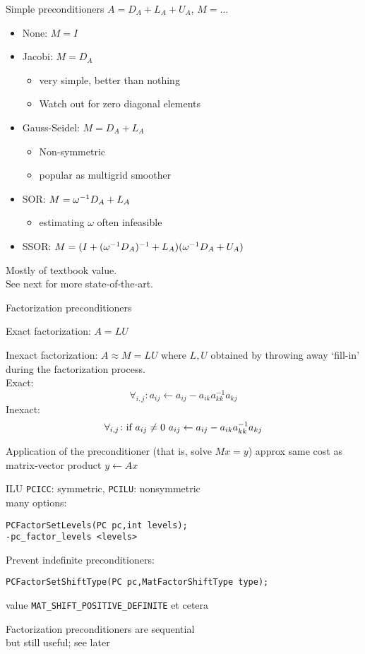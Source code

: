 \begin{numberedframe}{Simple preconditioners}
  $A = D_A+L_A+U_A$, $M=\ldots$
  \begin{itemize}
  \item None: $M=I$
  \item Jacobi: $M=D_A$
    \begin{itemize}
    \item very simple, better than nothing
    \item Watch out for zero diagonal elements
    \end{itemize}
  \item Gauss-Seidel: $M=D_A+L_A$
    \begin{itemize}
    \item Non-symmetric
    \item popular as multigrid smoother
    \end{itemize}
  \item SOR: $M=\omega^{-1} D_A+L_A$
    \begin{itemize}
    \item estimating $\omega$ often infeasible
    \end{itemize}
  \item SSOR: $M=(I+(\omega^{-1} D_A)^{-1}+L_A)(\omega^{-1} D_A+U_A)$
  \end{itemize}
  Mostly of textbook value.\\
  See next for more state-of-the-art.
\end{numberedframe}

\begin{numberedframe}{Factorization preconditioners}

Exact factorization: $A=LU$

Inexact factorization: $A\approx M=LU$ where $L,U$
obtained by throwing away `fill-in' during the factorization process.\\
Exact:
\[ \forall_{i,j}\colon a_{ij}\leftarrow a_{ij}-a_{ik}a_{kk}^{-1}a_{kj} \]
Inexact:
\[ \forall_{i,j}\colon \hbox{if $a_{ij}\not=0$ }
   a_{ij}\leftarrow a_{ij}-a_{ik}a_{kk}^{-1}a_{kj} \]

Application of the preconditioner (that is, solve $Mx=y$)
approx same cost as matrix-vector product $y\leftarrow Ax$
\end{numberedframe}

\begin{numberedframe}{ILU}
\lstinline{PCICC}: symmetric, \lstinline{PCILU}: nonsymmetric\\
many options:
\begin{lstlisting}
PCFactorSetLevels(PC pc,int levels);
-pc_factor_levels <levels>
\end{lstlisting}

Prevent indefinite preconditioners:
\begin{lstlisting}
PCFactorSetShiftType(PC pc,MatFactorShiftType type);
\end{lstlisting}
value \lstinline{MAT_SHIFT_POSITIVE_DEFINITE} et cetera

Factorization preconditioners are sequential\\
but still useful; see later

\end{numberedframe}

